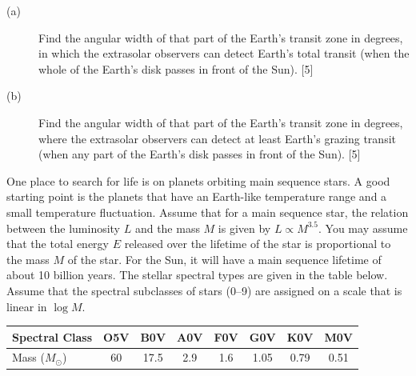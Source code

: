 
\begin{description}
\item[(a)] Find the angular width of that part of the Earth's transit zone in
  degrees, in which the extrasolar observers can detect Earth's total transit
  (when the whole of the Earth's disk passes in front of the Sun). \hfill[5]
\item[(b)] Find the angular width of that part of the Earth's transit zone in
  degrees, where the extrasolar observers can detect at least Earth's grazing
  transit (when any part of the Earth's disk passes in front of the Sun).
  \hfill[5]
\end{description}

One place to search for life is on planets orbiting main sequence stars. A good
starting point is the planets that have an Earth-like temperature range and a
small temperature fluctuation. Assume that for a main sequence star, the
relation between the luminosity $L$ and the mass $M$ is given by
$L \propto M^{3.5}$. You may assume that the total energy $E$ released over the
lifetime of the star is proportional to the mass $M$ of the star. For the Sun,
it will have a main sequence lifetime of about 10 billion years. The stellar
spectral types are given in the table below. Assume that the spectral subclasses
of stars (0--9) are assigned on a scale that is linear in $\log M$.

\begin{center}
\begin{tabular}{lccccccc}
\toprule
Spectral Class & O5V & B0V & A0V & F0V & G0V & K0V & M0V \\
\midrule
Mass ($M_\odot$) & 60 & 17.5 & 2.9 & 1.6 & 1.05 & 0.79 & 0.51 \\
\bottomrule
\end{tabular}
\end{center}

